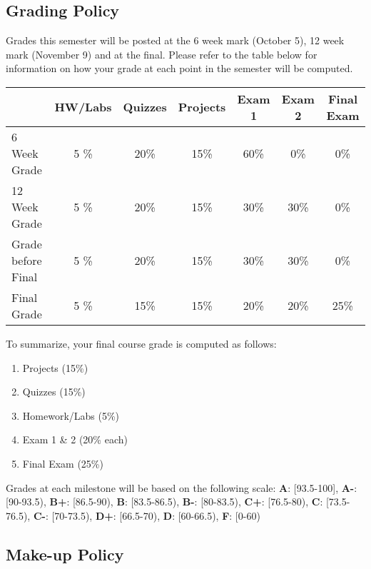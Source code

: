 \documentclass[letterpaper,hidelinks,oneside,11pt]{article}%
\begin{document}
\subsection*{Grading Policy}

Grades this semester will be posted at the 6 week mark (October 5), 12 week mark (November 9) and at the final. Please refer to the table below for information on how your grade at each point in the semester will be computed.

\begin{center}
\begin{tabular}{|l|c|c|c|c|c|c|}
  \hline
 &  \textbf{HW/Labs} & \textbf{Quizzes} & \textbf{Projects} & \textbf{Exam 1} & \textbf{Exam 2} & \textbf{Final Exam} \\ \hline
6 Week Grade       & 5 \% & 20\% & 15\% & 60\%   & 0\%    & 0\% \\ \hline
12 Week Grade      & 5 \% & 20\% & 15\% & 30\%   & 30\%   & 0\% \\ \hline
Grade before Final & 5 \% & 20\% & 15\% & 30\%   & 30\%   & 0\% \\ \hline
Final Grade        & 5 \% & 15\% & 15\% & 20\%   & 20\%   & 25\% \\
  \hline
\end{tabular}\end{center}

To summarize, your final course grade is computed as follows:

\begin{enumerate} \itemsep0em 
	\item Projects  (15\%)
	\item Quizzes (15\%)
	\item Homework/Labs (5\%)
	\item Exam 1 \& 2 (20\% each)
	\item Final Exam (25\%)
\end{enumerate}

Grades at each milestone will be based on the following scale: 
\textbf{A}: [93.5-100], \textbf{A-}: [90-93.5), \textbf{B+}: [86.5-90), \textbf{B}: [83.5-86.5), \textbf{B-}: [80-83.5), \textbf{C+}: [76.5-80), \textbf{C}: [73.5-76.5), \textbf{C-}: [70-73.5), \textbf{D+}: [66.5-70), \textbf{D}: [60-66.5), \textbf{F}: [0-60)


\subsection*{Make-up Policy}
\end{document}
